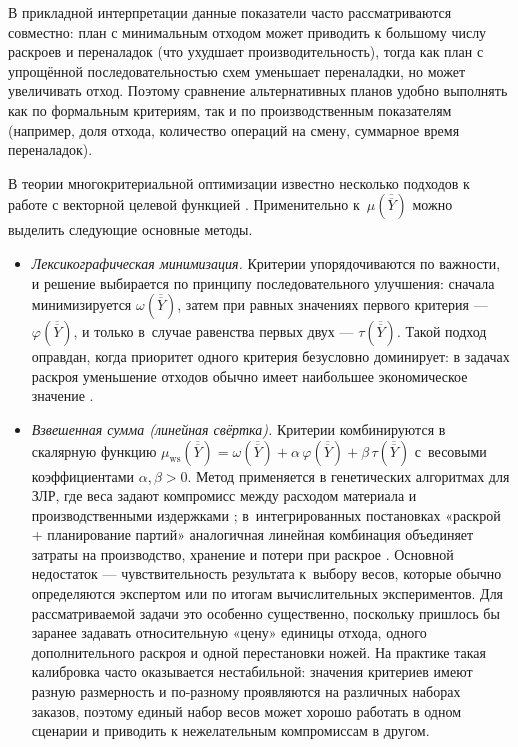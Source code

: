 В прикладной интерпретации данные показатели часто рассматриваются совместно: план с минимальным отходом может приводить к большому числу раскроев и переналадок (что ухудшает производительность), тогда как план с упрощённой последовательностью схем уменьшает переналадки, но может увеличивать отход.
Поэтому сравнение альтернативных планов удобно выполнять как по формальным критериям, так и по производственным показателям (например, доля отхода, количество операций на смену, суммарное время переналадок).

В теории многокритериальной оптимизации известно несколько подходов к работе с векторной целевой функцией \cite{васильев2016методы,зенков2017методы,струченков2017методы, deb2001_moo_ea, tkindt2006_multicriteria_scheduling}.
Применительно к~$\mu(\overline{\overline{Y}})$ можно выделить следующие основные методы.
\begin{itemize}
  \item \emph{Лексикографическая минимизация.}
Критерии упорядочиваются по важности, и решение выбирается по принципу последовательного улучшения: сначала минимизируется $\omega(\overline{\overline{Y}})$, затем при равных значениях первого критерия — $\varphi(\overline{\overline{Y}})$, и только в~случае равенства первых двух — $\tau(\overline{\overline{Y}})$.
Такой подход оправдан, когда приоритет одного критерия безусловно доминирует: в задачах раскроя уменьшение отходов обычно имеет наибольшее экономическое значение \cite{haessler1991,cerqueira2021,vanderbeck2000}.

  \item \emph{Взвешенная сумма (линейная свёртка).}
Критерии комбинируются в скалярную функцию
$\mu_{\text{ws}}(\overline{\overline{Y}}) = \omega(\overline{\overline{Y}}) + \alpha\,\varphi(\overline{\overline{Y}}) + \beta\,\tau(\overline{\overline{Y}})$
с~весовыми коэффициентами $\alpha,\beta>0$.
Метод применяется в генетических алгоритмах для ЗЛР, где веса задают компромисс между расходом материала и производственными издержками \cite{araujo2014genetic,golfeto2009genetic};
в~интегрированных постановках «раскрой + планирование партий» аналогичная линейная комбинация объединяет затраты на производство, хранение и потери при раскрое \cite{poltroniere2016tema,nonas2000combined}.
Основной недостаток — чувствительность результата к~выбору весов, которые обычно определяются экспертом или по итогам вычислительных экспериментов. Для рассматриваемой задачи это особенно существенно, поскольку пришлось бы заранее задавать относительную «цену» единицы отхода, одного дополнительного раскроя и одной перестановки ножей. На практике такая калибровка часто оказывается нестабильной: значения критериев имеют разную размерность и по-разному проявляются на различных наборах заказов, поэтому единый набор весов может хорошо работать в одном сценарии и приводить к нежелательным компромиссам в другом.


\end{itemize}
